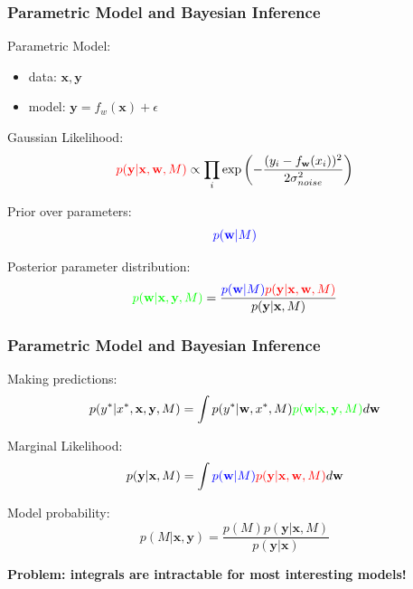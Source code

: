 \documentclass[10pt]{beamer}
\newcommand{\bx}{\mathbf{x}}
\newcommand{\by}{\mathbf{y}}
\newcommand{\bw}{\mathbf{w}}
\begin{document}
  \begin{frame}
    \frametitle{Parametric Model and Bayesian Inference}
    Parametric Model:
      \begin{itemize}
        \item data: $\bx, \by$
        \item model: $\by = f_w(\bx) + \epsilon$
      \end{itemize}

    \pause

    Gaussian Likelihood:
      \begin{equation*}
        \textcolor{red}{p(\by|\bx, \bw, M)} \propto \prod_i \exp \left( - \frac{ (y_i - f_{\bw}(x_i))^2}{2 \sigma_{noise}^2} \right)
      \end{equation*}

    \pause

    Prior over parameters:
      \begin{equation*}
        \textcolor{blue}{p(\bw|M)}
      \end{equation*}

    \pause

    Posterior parameter distribution:
      \begin{equation*}
        \textcolor{green}{p(\bw|\bx,\by,M)} = \frac{\textcolor{blue}{p(\bw|M)} \textcolor{red}{p(\by|\bx, \bw, M)}}{p(\by|\bx,M)}
      \end{equation*}
  \end{frame}

  \begin{frame}
    \frametitle{Parametric Model and Bayesian Inference}

    Making predictions:
      \begin{equation*}
        p(y^*|x^*,\bx,\by,M) = \int p(y^*|\bw,x^*,M) \textcolor{green}{p(\bw|\bx,\by,M)} d\bw
      \end{equation*}

    \pause

    Marginal Likelihood:
      \begin{equation*}
        p(\by|\bx,M) = \int \textcolor{blue}{p(\bw|M)} \textcolor{red}{p(\by|\bx, \bw, M)} d\bw
      \end{equation*}

    \pause

    Model probability:
      \begin{equation*}
        p(M|\bx,\by) = \frac{p(M)p(\by|\bx,M)}{p(\by|\bx)}
      \end{equation*}

    \pause

    \begin{center}
      \textbf{Problem: integrals are intractable for most interesting models!}
    \end{center}
  \end{frame}
\end{document}
